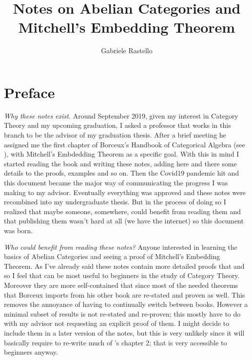 \documentclass[12pt, letter paper, english, reqno]{article}
\theoremstyle{myteo}
\begin{document}

\title{Notes on Abelian Categories and Mitchell's Embedding Theorem}
\author{Gabriele Rastello}
\maketitle
\tableofcontents

\newpage
\section*{Preface}


\medskip\noindent\emph{Why these notes exist.}
Around September 2019, given my interest in Category Theory and my upcoming graduation, I asked a professor that works in this branch to be the advisor of my graduation thesis.
After a brief meeting he assigned me the first chapter of Borceux's Handbook of Categorical Algebra (see \cite{handbook2}), with Mitchell's Embdedding Theorem as a specific goal.
With this in mind I started reading the book and writing these notes, adding here and there some details to the proofs, examples and so on.
Then the Covid19 pandemic hit and this document became the major way of communicating the progress I was making to my advisor.
Eventually everything was approved and these notes were recombined into my undergraduate thesis.
But in the process of doing so I realized that maybe someone, somewhere, could benefit from reading them and that publishing them wasn't hard at all (we have the internet) so this document was born.

\medskip\noindent\emph{Who could benefit from reading these notes?}
Anyone interested in learning the basics of Abelian Categories and seeing a proof of Mitchell's Embedding Theorem.
As I've already said these notes contain more detailed proofs that \cite{handbook2} and so I feel that can be most useful to beginners in the study of Category Theory.
Moreover they are more self-contained that \cite{handbook2} since most of the needed theorems that Borceux imports from his other book are re-stated and proven as well.
This removes the annoyance of having to continually switch between books.
However a minimal subset of results is not re-stated and re-proven; this mostly have to do with my advisor not requesting an explicit proof of them.
I might decide to include them in a later version of the notes, but this is very unlikely since it will basically require to re-write much of \cite{handbook1}'s chapter 2; that is very accessible to beginners anyway.
\end{document}
